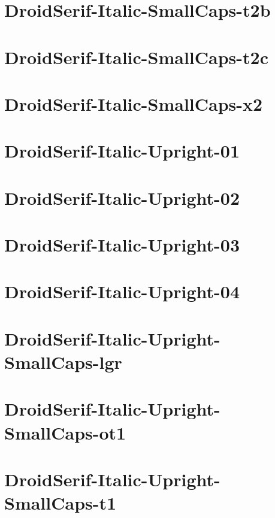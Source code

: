 \documentclass{article}
\begin{document}
\section{DroidSerif-Italic-SmallCaps-t2b}

\section{DroidSerif-Italic-SmallCaps-t2c}

\section{DroidSerif-Italic-SmallCaps-x2}

\section{DroidSerif-Italic-Upright-01}

\section{DroidSerif-Italic-Upright-02}

\section{DroidSerif-Italic-Upright-03}

\section{DroidSerif-Italic-Upright-04}

\section{DroidSerif-Italic-Upright-SmallCaps-lgr}

\section{DroidSerif-Italic-Upright-SmallCaps-ot1}

\section{DroidSerif-Italic-Upright-SmallCaps-t1}
\end{document}
